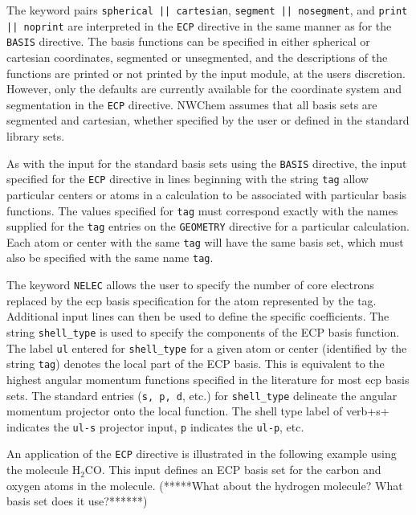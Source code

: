 The keyword pairs \verb+spherical || cartesian+,
 \verb+segment || nosegment+, and \verb+print || noprint+ are interpreted
in the \verb+ECP+ directive in the same manner as for the \verb+BASIS+
directive.  The basis functions can be specified in either spherical or 
cartesian coordinates, segmented or unsegmented, and the descriptions of
the functions are printed or not printed by the input module, at the users
discretion.  However, only the defaults are currently available for
the coordinate system and segmentation in the \verb+ECP+ directive.   
NWChem assumes
that all basis sets are segmented and cartesian, whether specified by the 
user or defined in the standard library sets.

As with the input for the standard basis sets using the \verb+BASIS+
directive, the input specified for the \verb+ECP+ directive in lines 
beginning with the string \verb+tag+
allow particular centers or atoms in a calculation to be associated with
particular basis functions.  The values specified for \verb+tag+
must correspond exactly with the names supplied for the \verb+tag+ entries
on the \verb+GEOMETRY+ directive for a particular calculation.  Each atom
or center with the same \verb+tag+ will have the same basis set, which must
also be specified with the same name \verb+tag+.

The keyword \verb+NELEC+ allows the user to specify the number of core 
electrons replaced by
the ecp basis specification for the atom represented by the tag.  Additional
input lines can then be used to define the specific coefficients.
The string \verb+shell_type+ is used to specify the components of the
ECP basis function.  The label \verb+ul+ entered for \verb+shell_type+
for a given atom or center (identified by the string \verb+tag+) denotes
the local part of the ECP basis.  This is equivalent to the highest 
angular momentum
functions specified in the literature for most ecp basis sets.  The
standard entries (\verb+s, p, d+, etc.) for \verb+shell_type+ delineate 
the angular momentum projector onto the local function.  The shell type 
label of verb+s+ indicates the \verb+ul-s+ projector input, \verb+p+ 
indicates the \verb+ul-p+, etc.

An application of the \verb+ECP+ directive is illustrated in the following 
example using the molecule  H$_2$CO.  This input defines an ECP basis set 
for the  carbon and oxygen atoms in the molecule.
(*****What about the hydrogen molecule?  What basis set does it use?******)



